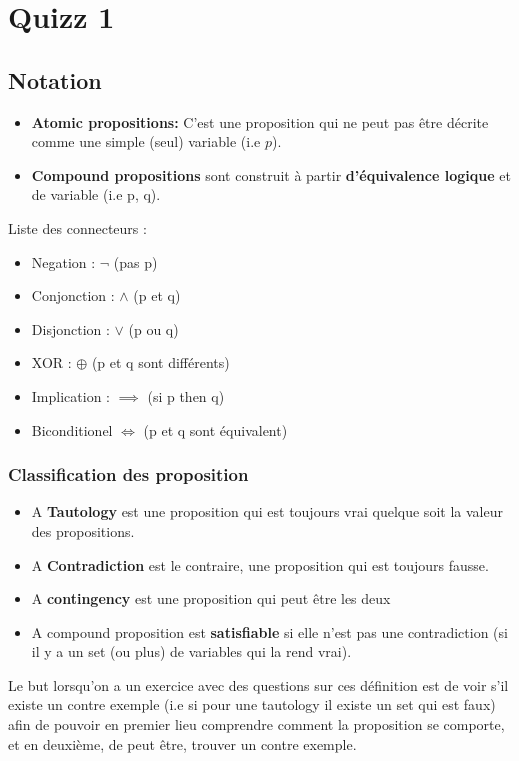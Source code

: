 \chapter{Quizz 1}


\section{Notation}
\begin{itemize}
    \item \textbf{Atomic propositions: } C'est une proposition qui ne peut pas être décrite comme une simple (seul) variable (i.e $p$).
    \item \textbf{Compound propositions} sont construit à partir \textbf{d'équivalence logique} et de variable (i.e p, q).
\end{itemize}
Liste des connecteurs :
\begin{itemize}
    \item Negation : $\neg$ (pas p)
    \item Conjonction : $\wedge$ (p et q)
    \item Disjonction : $\vee$ (p ou q)
    \item XOR : $\oplus$ (p et q sont différents)
    \item Implication : $\implies$ (si p then q)
    \item Biconditionel $\iff$ (p et q sont équivalent)
\end{itemize}
\subsection{Classification des proposition}

\begin{itemize}
    \item A \textbf{Tautology} est une proposition qui est toujours vrai quelque soit la valeur des propositions.
    \item  A \textbf{Contradiction} est le contraire, une proposition qui est toujours fausse.
    \item A \textbf{contingency} est une proposition qui peut être les deux
    \item A compound proposition est \textbf{satisfiable} si elle n'est pas une contradiction (si il y a un set (ou plus) de variables qui la rend vrai).
\end{itemize}

Le but lorsqu'on a un exercice avec des questions sur ces définition est de voir s'il existe un contre exemple (i.e si pour une tautology il existe un set qui est faux) afin de pouvoir en premier lieu comprendre comment la proposition se comporte, et en deuxième, de peut être, trouver un contre exemple.

